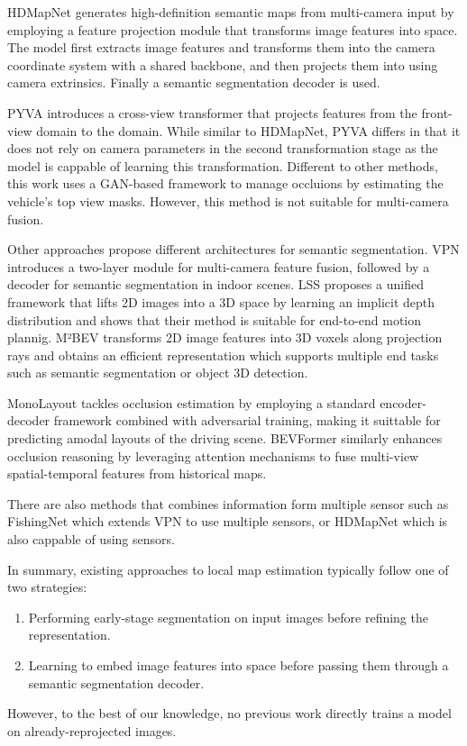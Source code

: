 {HDMapNet \cite{HDMapNet} generates high-definition semantic maps from multi-camera input by employing a feature projection module that transforms image features into  space. The model first extracts image features and transforms them into the camera coordinate system with a shared  backbone, and then projects them into  using camera extrinsics. Finally a semantic segmentation decoder is used.

PYVA \cite{PYVA} introduces a cross-view transformer that projects features from the front-view domain to the  domain. While similar to HDMapNet, PYVA differs in that it does not rely on camera parameters in the second transformation stage as the model is cappable of learning this transformation. Different to other methods, this work uses a GAN-based framework to manage occluions by estimating the vehicle's top view masks. However, this method is not suitable for multi-camera fusion.

Other approaches propose different architectures for  semantic segmentation. VPN \cite{view_parsing_network} introduces a two-layer  module for multi-camera feature fusion, followed by a decoder for semantic segmentation in indoor scenes. LSS \cite{lift_splat_shoot} proposes a unified framework that lifts 2D images into a 3D space by learning an implicit depth distribution and shows that their method is suitable for end-to-end motion plannig. M²BEV \cite{m2bev} transforms 2D image features into 3D voxels along projection rays and obtains an efficient  representation which supports multiple end tasks such as semantic segmentation or object 3D detection.

MonoLayout \cite{mono_layout} tackles occlusion estimation by employing a standard encoder-decoder framework combined with adversarial training, making it suittable for predicting amodal layouts of the driving scene. BEVFormer \cite{BEVFormer} similarly enhances occlusion reasoning by leveraging attention mechanisms to fuse multi-view spatial-temporal features from historical  maps.

There are also methods that combines information form multiple sensor such as FishingNet \cite{fishingnet} which extends VPN to use multiple sensors, or HDMapNet which is also cappable of using  sensors.  


In summary, existing approaches to local  map estimation typically follow one of two strategies: 
\begin{enumerate}
    \item Performing early-stage segmentation on input images before refining the  representation.
    \item Learning to embed image features into  space before passing them through a semantic segmentation decoder.
\end{enumerate}
However, to the best of our knowledge, no previous work directly trains a model on already-reprojected  images.

}
